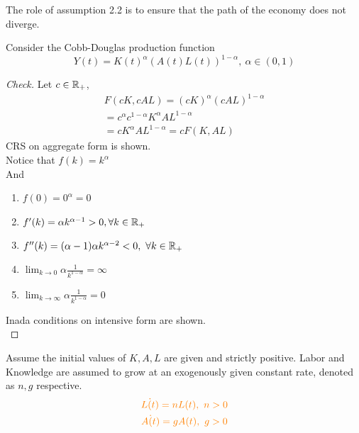 \documentclass[]{article}
\begin{document}
			\begin{remark}	
			The role of assumption 2.2 is to ensure that the path of the economy does not diverge.
			\end{remark}
			
			\begin{example}
				Consider the Cobb-Douglas production function
				\[
					Y(t) = K(t)^\alpha (A(t)L(t))^{1 - \alpha},\ \alpha \in (0, 1)
				\]
				
				\begin{proof}[Check]
					Let $c \in \mathbb{R}_+$, 
					\begin{gather*}
						F(cK, cAL) = (cK)^\alpha (cAL)^{1 - \alpha} \\
						= c^\alpha c^{1-\alpha} K^\alpha AL^{1-\alpha} \\
						= cK^{\alpha} AL^{1-\alpha} = cF(K, AL)
					\end{gather*}
					CRS on aggregate form is shown. \\
					Notice that $f(k) = k^{\alpha}$ \\
					And 
					\begin{enumerate}
						\item $f(0) = 0^{\alpha} = 0$
						\item $f'(k) = \alpha k ^ {\alpha - 1} > 0, \forall k \in \mathbb{R}_+$
						\item $f''(k) = (\alpha - 1)\alpha k ^ {\alpha - 2} < 0, \ \forall k \in \mathbb{R}_+$
						\item $\lim_{k \to 0} \alpha \frac{1}{k^{1-\alpha}} = \infty$
						\item $\lim_{k \to \infty} \alpha \frac{1}{k^{1-\alpha}} = 0$
					\end{enumerate}
					Inada conditions on intensive form are shown. \\
				\end{proof}
			\end{example}
			
			\begin{assumption}
				Assume the initial values of $K, A, L$ are given and strictly positive. Labor and Knowledge are assumed to grow at an exogenously given constant rate, denoted as $n, g$ respective.
				\begin{gather}
				\textcolor{orange}{
					\dot{L(t)} = nL(t),\ n > 0 }\\
					\textcolor{orange}{
						\dot{A(t)} = gA(t),\ g > 0
					}
				\end{gather}
			\end{assumption}
			
\end{document}
